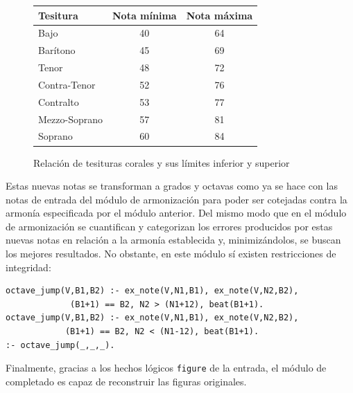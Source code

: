 \begin{figure}
	\centering
	\begin{tabular}{ | l | c | c | }
		\hline
		Tesitura & Nota mínima & Nota máxima \\ \hline \hline
		Bajo & 40 & 64 \\ \hline
		Barítono & 45 & 69 \\ \hline
		Tenor & 48 & 72 \\ \hline
		Contra-Tenor & 52 & 76 \\ \hline
		\hline
		Contralto & 53 & 77 \\ \hline
		Mezzo-Soprano & 57 & 81 \\ \hline
		Soprano & 60 & 84 \\ \hline
	\end{tabular}
	\label{fig:tesiturae}
	\caption{Relación de tesituras corales y sus límites inferior y superior}
\end{figure}

Estas nuevas notas se transforman a grados y octavas como ya se hace con las notas de entrada del módulo de armonización para poder ser cotejadas contra la armonía especificada por el módulo anterior. Del mismo modo que en el módulo de armonización se cuantifican y categorizan los errores producidos por estas nuevas notas en relación a la armonía establecida y, minimizándolos, se buscan los mejores resultados. No obstante, en este módulo sí existen restricciones de integridad:
	\begin{Verbatim}[frame=single]
octave_jump(V,B1,B2) :- ex_note(V,N1,B1), ex_note(V,N2,B2),
          	 (B1+1) == B2, N2 > (N1+12), beat(B1+1).
octave_jump(V,B1,B2) :- ex_note(V,N1,B1), ex_note(V,N2,B2),
           	(B1+1) == B2, N2 < (N1-12), beat(B1+1).
:- octave_jump(_,_,_).
	\end{Verbatim}
Finalmente, gracias a los hechos lógicos \texttt{figure} de la entrada, el módulo de completado es capaz de reconstruir las figuras originales.

